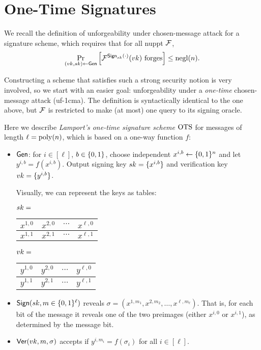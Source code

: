 \documentclass[11pt]{article}
\begin{document}
\thispagestyle{fancy}           %


\section{One-Time Signatures}
\label{sec:one-time-signatures}

We recall the definition of unforgeability under chosen-message attack
for a signature scheme, which requires that for all nuppt $\mathcal{F}$,
\[ \Pr_{(vk,sk) \gets \mathsf{Gen}} \left[ \mathcal{F}^{\mathsf{Sign}_{sk}(\cdot)}(vk)
  \text{ forges} \right] \leq \operatorname{negl}(n). \]

Constructing a scheme that satisfies such a strong security notion is
very involved, so we start with an easier goal: unforgeability under a
\emph{one-time} chosen-message attack (uf-1cma).  The definition is
syntactically identical to the one above, but $\mathcal{F}$ is restricted to
make (at most) one query to its signing oracle.

\newcommand{\ots}{\scheme{OTS}}

Here we describe \emph{Lamport's one-time signature scheme} $\ots$ for
messages of length $\ell = \operatorname{poly}(n)$, which is based on a one-way
function $f$:
\begin{itemize}
\item $\mathsf{Gen}$: for $i \in [\ell]$, $b \in \{0,1\}$, choose independent
  $x^{i,b} \gets \{0,1\}^n$ and let $y^{i,b} = f(x^{i,b})$.  Output
  signing key $sk = \{x^{i,b}\}$ and verification key $vk =
  \{y^{i,b}\}$.

  Visually, we can represent the keys as tables:

  \renewcommand{\arraystretch}{1.2}
  $sk = $ \begin{tabular}{|c|c|c|c|}
    \hline
    $x^{1,0}$ & $x^{2,0}$ & $\cdots$ & $x^{\ell,0}$ \\ \hline
    $x^{1,1}$ & $x^{2,1}$ & $\cdots$ & $x^{\ell,1}$ \\ \hline
  \end{tabular}
  \qquad $vk = $
  \begin{tabular}{|c|c|c|c|}
    \hline
    $y^{1,0}$ & $y^{2,0}$ & $\cdots$ & $y^{\ell,0}$ \\ \hline
    $y^{1,1}$ & $y^{2,1}$ & $\cdots$ & $y^{\ell,1}$ \\ \hline
  \end{tabular}

\item $\mathsf{Sign}(sk,m \in \{0,1\}^{\ell})$ reveals
  $\sigma=(x^{1,m_1},x^{2,m_2},\ldots,x^{\ell,m_{\ell}})$.  That is,
  for each bit of the message it reveals one of the two preimages
  (either $x^{i,0}$ or $x^{i,1}$), as determined by the message bit.

\item $\mathsf{Ver}(vk,m,\sigma)$ accepts if $y^{i,m_i} = f(\sigma_i)$ for
  all $i \in [\ell]$.
\end{itemize}
\end{document}
